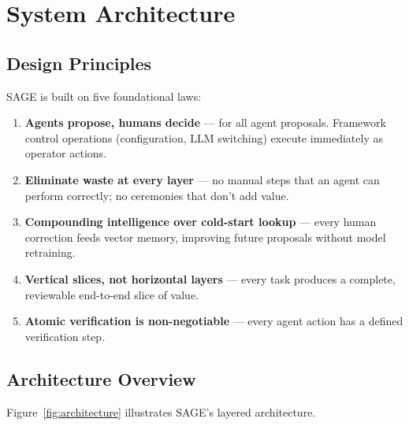 \documentclass[11pt,a4paper]{article}
\begin{document}
\section{System Architecture}
\label{sec:architecture}

\subsection{Design Principles}

SAGE is built on five foundational laws:

\begin{enumerate}[noitemsep]
    \item \textbf{Agents propose, humans decide} --- for all agent proposals. Framework control operations (configuration, LLM switching) execute immediately as operator actions.
    \item \textbf{Eliminate waste at every layer} --- no manual steps that an agent can perform correctly; no ceremonies that don't add value.
    \item \textbf{Compounding intelligence over cold-start lookup} --- every human correction feeds vector memory, improving future proposals without model retraining.
    \item \textbf{Vertical slices, not horizontal layers} --- every task produces a complete, reviewable end-to-end slice of value.
    \item \textbf{Atomic verification is non-negotiable} --- every agent action has a defined verification step.
\end{enumerate}

\subsection{Architecture Overview}

Figure~\ref{fig:architecture} illustrates SAGE's layered architecture.
\end{document}
